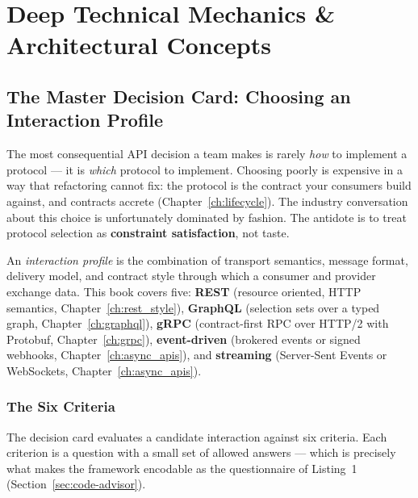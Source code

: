 \section{Deep Technical Mechanics \& Architectural Concepts}

\subsection{The Master Decision Card: Choosing an Interaction Profile}
\label{sec:decision-card}

The most consequential API decision a team makes is rarely \emph{how} to
implement a protocol --- it is \emph{which} protocol to implement. Choosing
poorly is expensive in a way that refactoring cannot fix: the protocol is the
contract your consumers build against, and contracts accrete
(Chapter~\ref{ch:lifecycle}). The industry conversation about this choice is
unfortunately dominated by fashion. The antidote is to treat protocol
selection as \textbf{constraint satisfaction}, not taste.

\begin{definition}
An \emph{interaction profile} is the combination of transport semantics,
message format, delivery model, and contract style through which a consumer
and provider exchange data. This book covers five: \textbf{REST} (resource
oriented, HTTP semantics, Chapter~\ref{ch:rest_style}), \textbf{GraphQL}
(selection sets over a typed graph, Chapter~\ref{ch:graphql}), \textbf{gRPC}
(contract-first RPC over HTTP/2 with Protobuf, Chapter~\ref{ch:grpc}),
\textbf{event-driven} (brokered events or signed webhooks,
Chapter~\ref{ch:async_apis}), and \textbf{streaming} (Server-Sent Events or
WebSockets, Chapter~\ref{ch:async_apis}).
\end{definition}

\subsubsection{The Six Criteria}

The decision card evaluates a candidate interaction against six criteria.
Each criterion is a question with a small set of allowed answers --- which is
precisely what makes the framework encodable as the questionnaire of
Listing~1 (Section~\ref{sec:code-advisor}).

